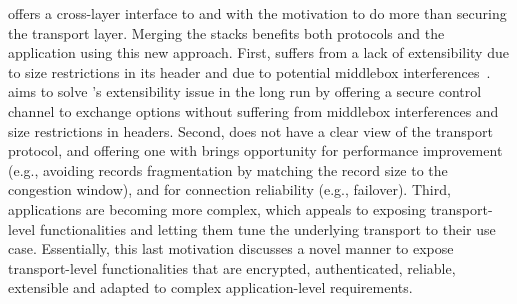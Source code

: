 

\tcpls offers a cross-layer interface to \tls and \tcp
with the motivation to do more than securing the transport layer. Merging the
stacks benefits both
protocols
and the application using this new approach. First, \tcp suffers from a lack of
extensibility due to size restrictions in its header and due to
potential middlebox interferences~\cite{honda2011still}. \tcpls aims to solve
\tcp's extensibility issue in the long run by offering a secure control channel
to exchange \tcp options without suffering from middlebox interferences and size restrictions in \tcp headers.
Second, \tls does not have a clear view of the transport protocol, and offering
one with \tcpls brings opportunity for performance improvement (e.g., avoiding
records fragmentation by matching the record size to the congestion window), and
for connection reliability (e.g., failover).  Third, applications are becoming
more complex, which appeals to exposing transport-level
functionalities and letting them tune the underlying transport to their use case.
Essentially, this last motivation discusses a novel manner to expose
transport-level functionalities that are encrypted, authenticated, reliable,
extensible and adapted to complex application-level requirements.


